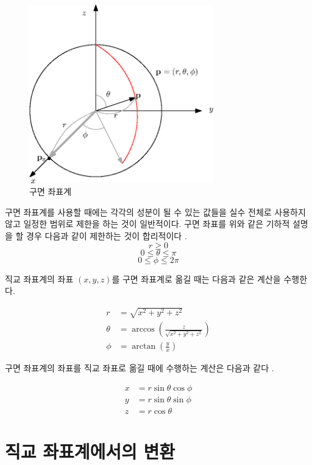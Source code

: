 \begin{figure}[h!]
  \centering
    \includegraphics[width=8cm]{Math_transform/sphericalCoord.eps}
    \caption{구면 좌표계}
    \label{fig:transform:sphericalCoord}
\end{figure}

구면 좌표계를 사용할 때에는 각각의 성분이 될 수 있는 값들을 실수 전체로 사용하지 않고 일정한 범위로 제한을 하는 것이 일반적이다.
구면 좌표를 위와 같은 기하적 설명을 할 경우 다음과 같이 제한하는 것이 합리적이다 \cite{wiki:SphericalCoord_eng, wiki:SphericalCoord_kor}.
$$r \geq 0$$
$$0 \leq \theta \leq \pi$$
$$0 \leq \phi \leq 2 \pi $$

직교 좌표계의 좌표 $(x,y,z)$를 구면 좌표계로 옮길 때는 다음과 같은 계산을 수행한다\cite{wiki:SphericalCoord_eng, wiki:SphericalCoord_kor}.


\begin{eqnarray}
r &= \sqrt{x^2 + y^2 + z^2} \\ \nonumber
\theta & = \arccos \left ( \frac{z}{\sqrt{x^2 + y^2 + z^2}} \right ) \\ \nonumber
\phi &= \arctan \left ( \frac{y}{x} \right )
\end{eqnarray}

구면 좌표계의 좌표를 직교 좌표로 옮길 때에 수행하는 계산은 다음과 같다 \cite{wiki:SphericalCoord_eng, wiki:SphericalCoord_kor}.


\begin{eqnarray}
x &= r \sin \theta \cos \phi \\ \nonumber
y & = r \sin \theta \sin \phi \\ \nonumber
z & =r \cos \theta
\end{eqnarray}


\section{직교 좌표계에서의 변환}


